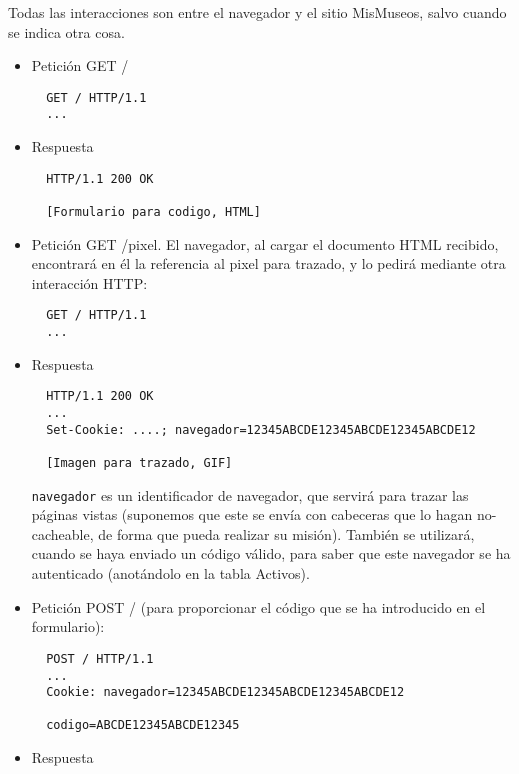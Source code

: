 Todas las interacciones son entre el navegador y el sitio MisMuseos, salvo cuando se indica otra cosa.

\begin{itemize}
\item Petición GET /

\begin{verbatim}
  GET / HTTP/1.1
  ...
\end{verbatim}

\item Respuesta

\begin{verbatim}
  HTTP/1.1 200 OK

  [Formulario para codigo, HTML]
\end{verbatim}

\item Petición GET /pixel. El navegador, al cargar el documento HTML recibido, encontrará en él la referencia al pixel para trazado, y lo pedirá mediante otra interacción HTTP:

\begin{verbatim}
  GET / HTTP/1.1
  ...
\end{verbatim}

\item Respuesta

\begin{verbatim}
  HTTP/1.1 200 OK
  ...
  Set-Cookie: ....; navegador=12345ABCDE12345ABCDE12345ABCDE12

  [Imagen para trazado, GIF]
\end{verbatim}

\verb|navegador| es un identificador de navegador, que servirá para trazar las páginas vistas (suponemos que este se envía con cabeceras que lo hagan no-cacheable, de forma que pueda realizar su misión). También se utilizará, cuando se haya enviado un código válido, para saber que este navegador se ha autenticado (anotándolo en la tabla Activos).

\item Petición POST / (para proporcionar el código que se ha introducido en el formulario):

\begin{verbatim}
  POST / HTTP/1.1
  ...
  Cookie: navegador=12345ABCDE12345ABCDE12345ABCDE12

  codigo=ABCDE12345ABCDE12345
\end{verbatim}

\item Respuesta


\end{itemize}
